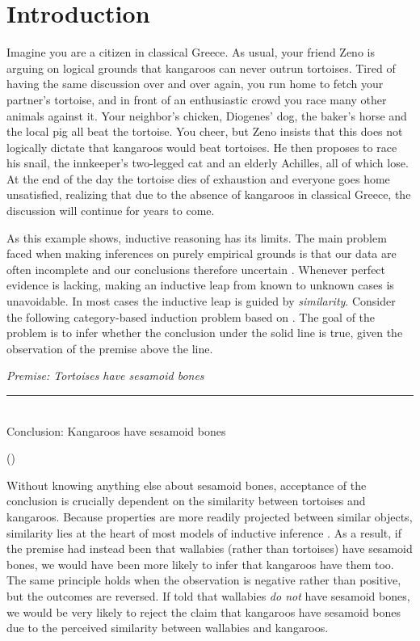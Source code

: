 \documentclass[authoryear,11pt]{elsarticle}
\newcounter{quotecount}
\newcommand{\MyQuote}[1]{\vspace{.5cm}\addtocounter{quotecount}{1}%
     \parbox{13cm}{\em #1}\hspace*{1cm}(\arabic{quotecount})\\[0cm]\vspace{.5cm}}
\begin{document}
\newpage

\section{Introduction}

Imagine you are a citizen in classical Greece. As usual, your friend Zeno is arguing on logical grounds that kangaroos can never outrun tortoises. Tired of having the same discussion over and over again, you run home to fetch your partner's tortoise, and in front of an enthusiastic crowd you race many other animals against it. Your neighbor's chicken, Diogenes' dog, the baker's horse and the local pig all beat the tortoise. You cheer, but Zeno insists that this does not logically dictate that kangaroos would beat tortoises. He then proposes to race his snail, the innkeeper's two-legged cat and an elderly Achilles, all of which lose. At the end of the day the tortoise dies of exhaustion and everyone goes home unsatisfied, realizing that due to the absence of kangaroos in classical Greece, the discussion will continue for years to come.

As this example shows, inductive reasoning has its limits. The main problem faced when making inferences on purely empirical grounds is that our data are often incomplete and our conclusions therefore uncertain \citep{Hume1739}. Whenever perfect evidence is lacking, making an inductive leap from known to unknown cases is unavoidable. In most cases the inductive leap is guided by \textit{similarity}. Consider the following category-based induction problem based on \citet{Rips1975}. The goal of the problem is to infer whether the conclusion under the solid line is  true, given the observation of the premise above the line.

\MyQuote{Premise: Tortoises have sesamoid bones\\[-5pt]
\rule[0pt]{250pt}{1pt} \\[-2pt]
Conclusion: Kangaroos have sesamoid bones}

\noindent
Without knowing anything else about sesamoid bones, acceptance of the conclusion is crucially dependent on the similarity between tortoises and kangaroos. Because properties are more readily projected between similar objects, similarity lies at the heart of most models of inductive inference \citep{Heit1998bay, Bloketal2007, Hayesetal2010, Medinetal2003, Oshersonetal1991, Oshersonetal1990, Sloman1993, Smithetal1993, Rips1975, Shepard1987}. As a result, if the premise had instead been that wallabies (rather than tortoises) have sesamoid bones, we would have been more likely to infer that kangaroos have them too. The same principle holds when the observation is negative rather than positive, but the outcomes are reversed. If told that wallabies {\it do not} have sesamoid bones, we would be very likely to reject the claim that kangaroos have sesamoid bones due to the perceived similarity between wallabies and kangaroos.
\end{document}
